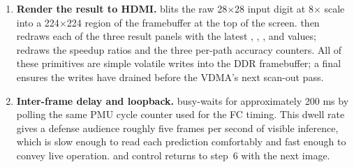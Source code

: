 \begin{enumerate}[leftmargin=2.1em, label=\textbf{Step \arabic*.}, start=6,
                  itemsep=4pt, topsep=2pt]
\item \textbf{Render the result to HDMI.} 
blits the raw 28$\times$28 input digit at 8$\times$ scale into a 224$\times$224
region of the framebuffer at the top of the screen.
 then redraws each of the three result panels
with the latest , , , and 
values;  redraws the speedup ratios and the
three per-path accuracy counters. All of these primitives are simple
volatile writes into the DDR framebuffer; a final  ensures
the writes have drained before the VDMA's next scan-out pass.

\item \textbf{Inter-frame delay and loopback.}
 busy-waits for approximately
200 ms by polling the same PMU cycle counter used for the FC timing.
This dwell rate gives a defense audience roughly five frames per
second of visible inference, which is slow enough to read each
prediction comfortably and fast enough to convey live operation.
 and control returns to step~6 with the next image.
\end{enumerate}

